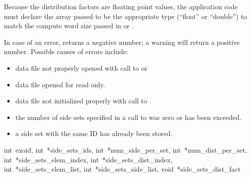 Because the distribution factors are floating point values, the
application code must declare the array passed to be the appropriate
type (``float'' or ``double'') to match the compute word size passed
in  or .

In case of an error,  returns a
negative number; a warning will return a positive number.  Possible
causes of errors include:

\begin{itemize}
 \item data file not properly opened with call to 
 or 

 \item data file opened for read only.

 \item data file not initialized properly with call to
 .

 \item the number of side sets specified in a call to
  was zero or has been exceeded.

 \item a side set with the same ID has already been stored.
\end{itemize}

{int~exoid, 
int~*side_sets_ids,
int~*num_side_per_set, 
int~*num_dist_per_set, 
int~*side_sets_elem_index,
int~*side_sets_dist_index, 
int~*side_sets_elem_list,
int~*side_sets_side_list, 
void~*side_sets_dist_fact}

